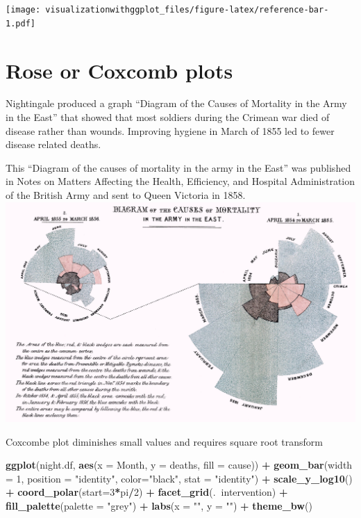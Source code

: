 \documentclass[]{krantz}
\makeatletter
\newenvironment{Shaded}{\begin{snugshade}}{\end{snugshade}}
\newcommand{\DataTypeTok}[1]{\textcolor[rgb]{0.13,0.29,0.53}{#1}}
\newcommand{\DecValTok}[1]{\textcolor[rgb]{0.00,0.00,0.81}{#1}}
\newcommand{\KeywordTok}[1]{\textcolor[rgb]{0.13,0.29,0.53}{\textbf{#1}}}
\newcommand{\NormalTok}[1]{#1}
\newcommand{\OperatorTok}[1]{\textcolor[rgb]{0.81,0.36,0.00}{\textbf{#1}}}
\newcommand{\StringTok}[1]{\textcolor[rgb]{0.31,0.60,0.02}{#1}}
\newenvironment{kframe}{%
\medskip{}
\setlength{\fboxsep}{.8em}
 \def\at@end@of@kframe{}%
 \ifinner\ifhmode%
  \def\at@end@of@kframe{\end{minipage}}%
  \begin{minipage}{\columnwidth}%
 \fi\fi%
 \def\FrameCommand##1{\hskip\@totalleftmargin \hskip-\fboxsep
 \colorbox{shadecolor}{##1}\hskip-\fboxsep
     \hskip-\linewidth \hskip-\@totalleftmargin \hskip\columnwidth}%
 \MakeFramed {\advance\hsize-\width
   \@totalleftmargin\z@ \linewidth\hsize
   \@setminipage}}%
 {\par\unskip\endMakeFramed%
 \at@end@of@kframe}
\renewenvironment{Shaded}{\begin{kframe}}{\end{kframe}}
\makeatother
\begin{document}
\texttt{[image: visualizationwithggplot\_files/figure-latex/reference-bar-1.pdf]}

\hypertarget{rose-or-coxcomb-plots}{%
\section{Rose or Coxcomb plots}\label{rose-or-coxcomb-plots}}

Nightingale produced a graph ``Diagram of the Causes of Mortality in the Army in the East'' that showed that most soldiers during the Crimean war died of disease rather than wounds. Improving hygiene in March of 1855 led to fewer disease related deaths.

This ``Diagram of the causes of mortality in the army in the East'' was published in Notes on Matters Affecting the Health, Efficiency, and Hospital Administration of the British Army and sent to Queen Victoria in 1858.
\includegraphics{images/Nightingale-mortality.jpg}

Coxcombe plot diminishes small values and requires square root transform

\begin{Shaded}
\begin{Highlighting}[]
\KeywordTok{ggplot}\NormalTok{(night.df, }\KeywordTok{aes}\NormalTok{(}\DataTypeTok{x =}\NormalTok{ Month, }\DataTypeTok{y =}\NormalTok{ deaths, }\DataTypeTok{fill =}\NormalTok{ cause)) }\OperatorTok{+}
\StringTok{  }\KeywordTok{geom_bar}\NormalTok{(}\DataTypeTok{width =} \DecValTok{1}\NormalTok{, }\DataTypeTok{position =} \StringTok{"identity"}\NormalTok{, }\DataTypeTok{color=}\StringTok{"black"}\NormalTok{, }\DataTypeTok{stat =} \StringTok{"identity"}\NormalTok{) }\OperatorTok{+}\StringTok{ }
\StringTok{  }\KeywordTok{scale_y_log10}\NormalTok{() }\OperatorTok{+}\StringTok{ }
\StringTok{  }\KeywordTok{coord_polar}\NormalTok{(}\DataTypeTok{start=}\DecValTok{3}\OperatorTok{*}\NormalTok{pi}\OperatorTok{/}\DecValTok{2}\NormalTok{)  }\OperatorTok{+}
\StringTok{  }\KeywordTok{facet_grid}\NormalTok{(.}\OperatorTok{~}\NormalTok{intervention)  }\OperatorTok{+}
\StringTok{  }\KeywordTok{fill_palette}\NormalTok{(}\DataTypeTok{palette =} \StringTok{"grey"}\NormalTok{) }\OperatorTok{+}
\StringTok{  }\KeywordTok{labs}\NormalTok{(}\DataTypeTok{x =} \StringTok{""}\NormalTok{, }\DataTypeTok{y =} \StringTok{""}\NormalTok{) }\OperatorTok{+}
\StringTok{  }\KeywordTok{theme_bw}\NormalTok{()}
\end{Highlighting}
\end{Shaded}
\end{document}
